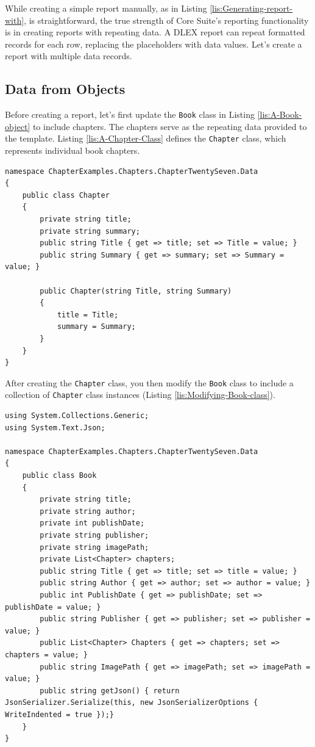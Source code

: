 \documentclass[american]{tufte-book}
\numberwithin{equation}{section}
\numberwithin{figure}{section}
\begin{document}
{{While creating a simple report manually, as in Listing \ref{lis:Generating-report-with},
is straightforward, the true strength of Core Suite's reporting functionality
is in creating reports with repeating data. A DLEX report can repeat
formatted records for each row, replacing the placeholders with data
values. Let's create a report with multiple data records.

\subsection{Data from Objects}

Before creating a report, let's first update the \texttt{Book} class
in Listing \ref{lis:A-Book-object} to include chapters. The chapters
serve as the repeating data provided to the template. Listing \ref{lis:A-Chapter-Class}
defines the \texttt{Chapter} class, which represents individual book
chapters.

\bgroup{}
\begin{lstlisting}[caption={A Chapter Class used with Book class.},label={lis:A-Chapter-Class},basicstyle={\footnotesize\ttfamily},breaklines=true]
namespace ChapterExamples.Chapters.ChapterTwentySeven.Data
{
    public class Chapter
    {
        private string title;
        private string summary;
        public string Title { get => title; set => Title = value; }
        public string Summary { get => summary; set => Summary = value; }

        public Chapter(string Title, string Summary)
        {
            title = Title;
            summary = Summary;
        }
    }
}
\end{lstlisting}
\leavevmode\egroup

After creating the \texttt{Chapter} class, you then modify the \texttt{Book}
class to include a collection of \texttt{Chapter} class instances
(Listing \ref{lis:Modifying-Book-class}).

\bgroup{}
\begin{lstlisting}[caption={Modifying Book class to include a collection of Chapter class instances.},label={lis:Modifying-Book-class},basicstyle={\footnotesize\ttfamily},breaklines=true]
using System.Collections.Generic;
using System.Text.Json;

namespace ChapterExamples.Chapters.ChapterTwentySeven.Data
{
    public class Book
    {
        private string title;
        private string author;
        private int publishDate;
        private string publisher;
        private string imagePath;
        private List<Chapter> chapters;
        public string Title { get => title; set => title = value; }
        public string Author { get => author; set => author = value; }
        public int PublishDate { get => publishDate; set => publishDate = value; }
        public string Publisher { get => publisher; set => publisher = value; }
        public List<Chapter> Chapters { get => chapters; set => chapters = value; }
        public string ImagePath { get => imagePath; set => imagePath = value; }
        public string getJson() { return JsonSerializer.Serialize(this, new JsonSerializerOptions { WriteIndented = true });}
    }
}
\end{lstlisting}
\leavevmode\egroup

}}
\end{document}
